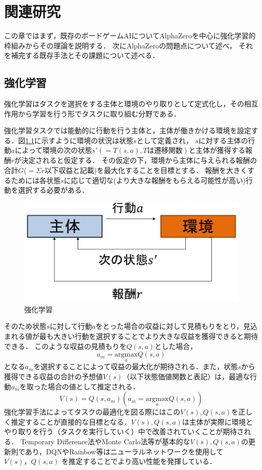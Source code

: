 \chapter{関連研究}
この章ではまず，既存のボードゲームAIについてAlphaZeroを中心に強化学習的枠組みからその理論を説明する．
次にAlphaZeroの問題点について述べ，
それを補完する既存手法とその課題について述べる．



\section{強化学習}
強化学習はタスクを選択をする主体と環境のやり取りとして定式化し，その相互作用から学習を行う形でタスクに取り組む分野である\cite{RL}．

強化学習タスクでは能動的に行動を行う主体と，主体が働きかける環境を設定する．図\ref{fig:RL}に示すように環境の状況は状態$s$として定義され，
$s$に対する主体の行動$a$によって環境の次の状態${s'}(=T(s, a), Tは遷移関数)$と主体が獲得する報酬$r$が決定されると仮定する．
その仮定の下，環境から主体に与えられる報酬の合計$G$($=\Sigma r$以下収益と記載)を最大化することを目標とする．
報酬を大きくするためには各状態$s$に応じて適切な(より大きな報酬をもらえる可能性が高い)行動を選択する必要がある．
\begin{figure}[htbp]
	\centering
	\includegraphics[width=\linewidth]{./figure/RL.png}
	\caption{強化学習}
	\label{fig:RL}
\end{figure}
そのため状態$s$に対して行動$a$をとった場合の収益に対して見積もりをとり，見込まれる値が最も大きい行動を選択することでより大きな収益を獲得できると期待できる．
このような収益の見積もりを$Q(s, a)$とした場合，
\begin{equation}
	{\displaystyle a_m = \underset{a}{\textrm{argmax}} Q(s, a)}
\end{equation}
となる$a_m$を選択することによって収益の最大化が期待される．また，状態$s$から獲得できる収益の合計の予想値$V(s)$（以下状態価値関数と表記）は，最適な行動$a_m$を取った場合の値として推定される．
\begin{equation}
	{\displaystyle V(s) = Q(s, a_m)(a_m = \underset{a}{\textrm{argmax}} Q(s, a))}
\end{equation}
強化学習手法によってタスクの最適化を図る際にはこの$V(s),Q(s, a)$を正しく推定することが直接的な目標となる．$V(s),Q(s, a)$は主体が実際に環境とやり取りを行う（タスクを実行していく）中で改善されていくことが期待される．
Temporary Difference法やMonte Carlo法等が基本的な$V(s),Q(s, a)$の更新則であり，DQN\cite{DQN}やRainbow\cite{rainbow}等はニューラルネットワークを使用して$V(s)，Q(s, a)$
を推定することでより高い性能を発揮している．



